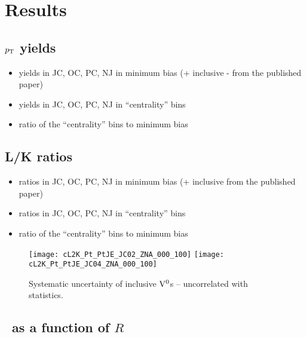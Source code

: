 \section{Results}
\label{sec:Results}

\subsection{$\pT$ yields}

\begin{itemize}
	\item yields in JC, OC, PC, NJ in minimum bias (+ inclusive - from the published paper)
	\item yields in JC, OC, PC, NJ in ``centrality'' bins
	\item ratio of the ``centrality'' bins to minimum bias 
\end{itemize}



\subsection{L/K ratios}

\begin{itemize}
	\item ratios in JC, OC, PC, NJ in minimum bias (+ inclusive from the published paper)
	\item ratios in JC, OC, PC, NJ in ``centrality'' bins
	\item ratio of the ``centrality'' bins to minimum bias 
\end{itemize}


\begin{figure}[t]
\begin{center}
\texttt{[image: cL2K\_Pt\_PtJE\_JC02\_ZNA\_000\_100]}
\texttt{[image: cL2K\_Pt\_PtJE\_JC04\_ZNA\_000\_100]}
\caption{Systematic uncertainty of inclusive ${\rm V}^{0}$s -- uncorrelated with statistics.}
\label{fig:c07LKration}
\end{center}
\end{figure}



\subsection{\Vzero\ as a function of $R$}

